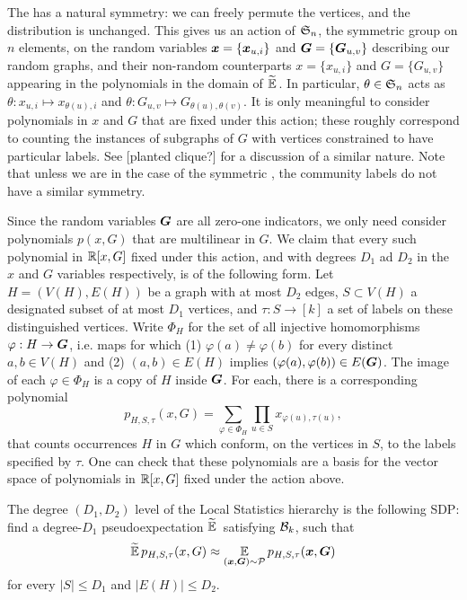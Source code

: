 The \model has a natural symmetry: we can freely permute the vertices, and the distribution is unchanged. This gives us an action of $\mathfrak{S}_n$, the symmetric group on $n$ elements, on the random variables ${\boldsymbol{x}} = \{{\boldsymbol{x}}_{u,i}\}$ and $\boldsymbol{G} = \{\boldsymbol{G}_{u,v}\}$ describing our random graphs, and their non-random counterparts $x = \{x_{u,i}\}$ and $G = \{G_{u,v}\}$ appearing in the polynomials in the domain of $\widetilde{\operatorname*{\mathbb{E}}}\,$. In particular, $\theta\in\mathfrak{S}_n$ acts as $\theta : x_{u,i} \mapsto x_{\theta(u),i}$ and $\theta : G_{u,v} \mapsto G_{\theta(u),\theta(v)}$. It is only meaningful to consider polynomials in $x$ and $G$ that are fixed under this action; these roughly correspond to counting the instances of subgraphs of $G$ with vertices constrained to have particular labels. See [planted clique?] for a discussion of a similar nature. Note that unless we are in the case of the symmetric \model, the community labels do not have a similar symmetry.

Since the random variables $\boldsymbol{G}$ are all zero-one indicators, we only need consider polynomials $p(x,G)$ that are multilinear in $G$. We claim that every such polynomial in $\mathbb{R}[x,G]$ fixed under this action, and with degrees $D_1$ ad $D_2$ in the $x$ and $G$ variables respectively, is of the following form. Let $H = (V(H),E(H))$ be a graph with at most $D_2$ edges, $S\subset V(H)$ a designated subset of at most $D_1$ vertices, and $\tau: S \to [k]$ a set of labels on these distinguished vertices. Write $\Phi_H$ for the set of all injective homomorphisms $\varphi: H \to \boldsymbol{G}$, i.e. maps for which (1) $\varphi(a)\neq\varphi(b)$ for every distinct $a,b\in V(H)$ and (2) $(a,b)\in E(H)$ implies $(\varphi(a),\varphi(b)) \in E(\boldsymbol{G})$. The image of each $\varphi \in \Phi_H$ is a copy of $H$ inside $\boldsymbol{G}$. For each, there is a corresponding polynomial
\begin{equation} \label{eq:graph-poly}
	p_{H,S,\tau}(x,G) = \sum_{\varphi\in\Phi_H}\prod_{u\in S} x_{\varphi(u),\tau(u)},
\end{equation}
that counts occurrences $H$ in $G$ which conform, on the vertices in $S$, to the labels specified by $\tau$. One can check that these polynomials are a basis for the vector space of polynomials in $\mathbb{R}[x,G]$ fixed under the action above.

\begin{definition} \label{def:ls-alg}
    The degree $(D_1,D_2)$ level of the Local Statistics hierarchy is the following SDP: find a degree-$D_1$ pseudoexpectation $\widetilde{\operatorname*{\mathbb{E}}}\,$ satisfying $\mathcal{B}_k$, such that
    \begin{align} \label{eq:lost-sdp}
    	\widetilde{\operatorname*{\mathbb{E}}}\, p_{H,S,\tau}(x,G) \approx \operatorname*{\mathbb{E}}_{({\boldsymbol{x}},\boldsymbol{G})\sim \mathcal{P}} p_{H,S,\tau}({\boldsymbol{x}},\boldsymbol{G})
    \end{align}
    for every $|S| \le D_1$ and $|E(H)| \le D_2$.
\end{definition}

